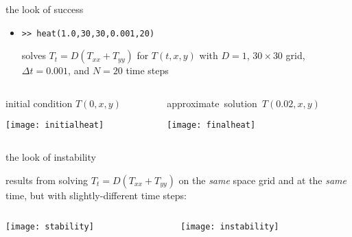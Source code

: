\begin{frame}{the look of success}

\begin{itemize}
\item[] \texttt{>>  heat(1.0,30,30,0.001,20)}

\medskip
solves $T_t = D(T_{xx} + T_{yy})$ for $T(t,x,y)$ with $D=1$, $30\times 30$ grid, $\Delta t = 0.001$, and $N=20$ time steps
\end{itemize}

\bigskip
\begin{columns}
\begin{column}{0.5\textwidth}
initial condition $T(0,x,y)$

\bigskip
\begin{center}
\texttt{[image: initialheat]}
\end{center}
\end{column}
\begin{column}{0.5\textwidth}
\mbox{approximate solution $T(0.02,x,y)$}

\bigskip
\begin{center}
\texttt{[image: finalheat]}
\end{center}
\end{column}
\end{columns}
\end{frame}


\begin{frame}{the look of instability}

results from solving $T_t = D(T_{xx} + T_{yy})$ on the \emph{same} space grid and at the \emph{same} time, but with slightly-different time steps:

\bigskip
\begin{columns}
\begin{column}{0.5\textwidth}
\begin{center}
\texttt{[image: stability]}

\end{center}
\end{column}
\begin{column}{0.5\textwidth}
\begin{center}
\texttt{[image: instability]}

\end{center}
\end{column}
\end{columns}
\end{frame}


